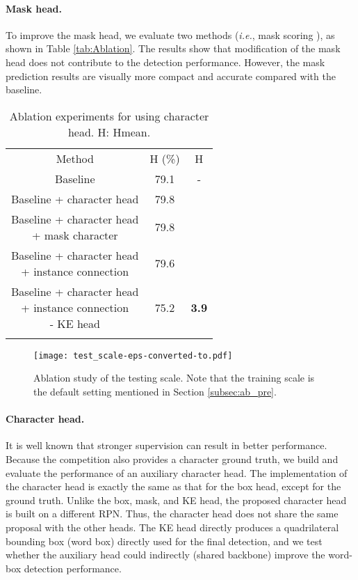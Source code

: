 \paragraph{Mask head.} To improve the mask head, we evaluate two methods (\textit{i.e.}, mask scoring \cite{huang2019mask}), as shown in Table \ref{tab:Ablation}. The results show that modification of the mask head does not contribute to the detection performance. However, the mask prediction results are visually more compact and accurate compared with the baseline. 
\begin{table}[t!]
  \caption{Ablation  experiments for using character head. H: Hmean.}
  \label{tab:character}       \centering
\begin{tabular}{ccc}
  \hline\noalign{\smallskip}
  Method & H (\%)  & H\\
  \noalign{\smallskip}\hline\noalign{\smallskip}
  Baseline & 79.1 & - \\
  \hline
  Baseline + character head  & 79.8 & \bf \color{red}{ 0.7} \\
\makecell*[c]{Baseline + character head \\+ mask character} & 79.8 & \bf \color{red}{ 0.7} \\
  \makecell*[c]{Baseline + character head \\+ instance connection} & 79.6 & \bf \color{red}{ 0.5} \\
  \makecell*[c]{Baseline + character head \\+ instance connection \\ - KE head} & 75.2 & \bf \textcolor[RGB]{0,160,0}{ 3.9} \\
  \noalign{\smallskip}\hline
  \end{tabular}
\end{table}

\begin{figure*}[!t]
  \centering
  \centerline{\texttt{[image: test\_scale-eps-converted-to.pdf]}}
  \caption{Ablation study of the testing scale. Note that the training scale is the default setting mentioned in Section \ref{subsec:ab_pre}.}\label{fig:test_scale}
\end{figure*}


\paragraph{Character head.} 
It is well known
that stronger supervision can result in better performance. Because the competition also provides a character ground truth, we build and evaluate  the performance of an auxiliary character head. The implementation of the character head is exactly the same as that for the box head, except for the ground truth. Unlike the box, mask, and KE head, the proposed character head is built on a different RPN. Thus, the character head does not share the same proposal with the other heads. The KE head directly produces 
a quadrilateral bounding box (word box) directly used for the final detection, and we test whether the auxiliary head could indirectly (shared backbone) improve the word-box detection performance. 

